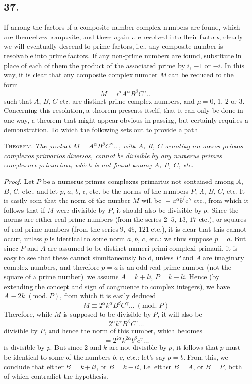 \documentclass[twoside,12pt, showframe]{memoir}
\renewcommand{\pmod}[1]{\;(\textrm{mod.}\;#1)}
\begin{document}
\subsection*{37.}

If among the factors of a composite number complex numbers are found, which are themselves composite, and these again are resolved into their factors, clearly we will eventually descend to prime factors, i.e., any composite number is resolvable into prime factors. If any non-prime numbers are found, substitute in place of each of them the product of the associated prime by \(i\), \(-1\) or \(-i\). In this way, it is clear that any composite complex number \(M\) can be reduced to the form
\[M=i^{\mu} A^{\alpha} B^{\beta} C^{\gamma} \ldots\]
such that \(A\), \(B\), \(C\) etc. are distinct prime complex numbers, and \(\mu=0\), \(1\), \(2\) or \(3\). Concerning this resolution, a theorem presents itself, that it can only be done in one way, a theorem that might appear obvious in passing, but certainly requires a demonstration. To which the following sets out to provide a path
%

\textsc{Theorem.} \textit{The product \(M=A^{\alpha} B^{\beta} C^{\gamma} \ldots\), with \(A\), \(B\), \(C\) denoting \(n u\) meros primos complexos primarios diversos, cannot be divisible by any numerus primus complexum primarium, which is not found among \(A\), \(B\), \(C\), etc.}
 
\textit{Proof.} Let \(P\) be a numerus primus complexus primarius not contained among \(A\), \(B\), \(C\), etc., and let \(p\), \(a\), \(b\), \(c\), etc. be the norms of the numbers \(P\), \(A\), \(B\), \(C\), etc. It is easily seen that the norm of the number \(M\) will be \(=a^{\alpha} b^{\beta} c^{\gamma}\) etc., from which it follows that if \(M\) were divisible by \({P}\), it should also be divisible by \(p\). Since the norms are either real prime numbers (from the series \(2\), \(5\), \(13\), \(17\) etc.), or squares of real prime numbers (from the series \(9\), \(49\), \(121\) etc.), it is clear that this cannot occur, unless \(p\) is identical to some norm \(a\), \(b\), \(c\), etc.: we thus suppose \(p=a\). But since \(P\) and \(A\) are assumed to be distinct numeri primi complexi primarii, it is easy to see that these cannot simultaneously hold, unless \(P\) and \(A\) are imaginary complex numbers, and therefore \(p=a\) is an odd real prime number (not the square of a prime number): we assume \(A=k+l i\), \(P=k-l i\). Hence (by extending the concept and sign of congruence to complex integers), we have \(A \equiv 2 k\pmod{P}\), from which it is easily deduced
\[M \equiv 2^{\alpha} k^{\alpha} B^{\beta} C^{\gamma} \ldots\pmod{P}\]
Therefore, while \(M\) is supposed to be divisible by \(P\), it will also be
\[2^{\alpha} k^{\alpha} B^{\beta} C^{\gamma} \ldots\]
divisible by \(P\), and hence the norm of this number, which becomes
\[=2^{2 \alpha} k^{2 \alpha} b^{\beta} c^{\gamma} \ldots\]
is divisible by \(p\). But since 2 and \(k\) are not divisible by \(p\), it follows that \(p\) must be identical to some of the numbers \(b\), \(c\), etc.: let's say \(p=b\). From this, we conclude that either \(B=k+l i\), or \(B=k-l i\), i.e. either \(B=A\), or \(B=P\), both of which contradict the hypothesis.
 
\end{document}
